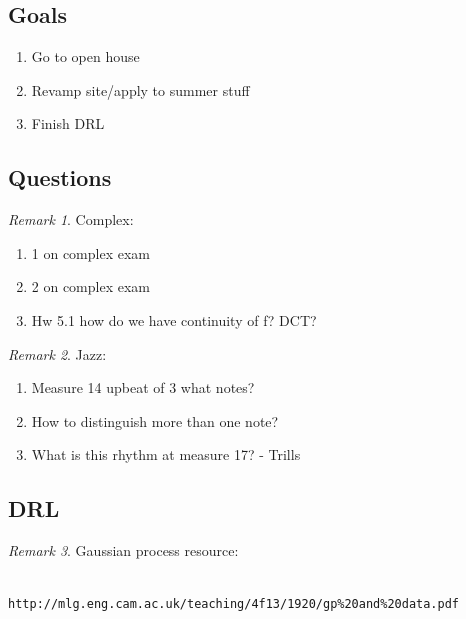 \documentclass[11pt]{article}
\theoremstyle{remark}
\newtheorem{remark}{Remark}
\begin{document}
\subsection{Goals}

\begin{enumerate}
	\item Go to open house
	\item Revamp site/apply to summer stuff
	\item Finish DRL
\end{enumerate}

\subsection{Questions}

\begin{remark}
Complex:
\begin{enumerate}
	\item 1 on complex exam
	\item 2 on complex exam
	\item Hw 5.1 how do we have continuity of f? DCT?
\end{enumerate}
\end{remark}

\begin{remark}
Jazz:
\begin{enumerate}
	\item Measure 14 upbeat of 3 what notes?
	\item How to distinguish more than one note?
	\item What is this rhythm at measure 17? - Trills
\end{enumerate}
\end{remark}

\subsection{DRL}

\begin{remark}
	Gaussian process resource:
	\begin{verbatim}
		http://mlg.eng.cam.ac.uk/teaching/4f13/1920/gp%20and%20data.pdf
	\end{verbatim}
\end{remark}
\end{document}
